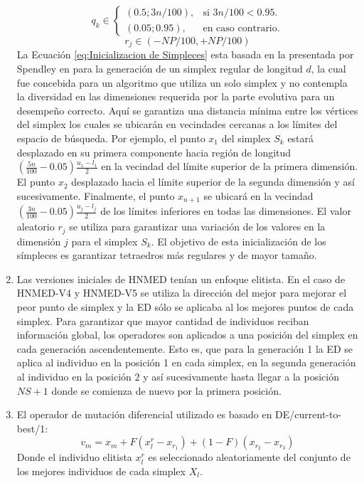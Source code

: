 \begin{enumerate}
	\begin{equation}
	q_k \in \begin{cases}
	(0.5;3n/100), & \text{si $3n/100 <0.95$}.\\
	(0.05;0.95), & \text{en caso contrario}.
	\end{cases}
	\end{equation}
	\begin{equation}
	r_j \in (-NP/100,+NP/100) 
	\end{equation}
	La Ecuación \ref{eq:Inicializacion de Simpleces} esta basada en la presentada por Spendley en \cite{spendley_sequential_1962} para la generación de un simplex regular de longitud $d$, la cual fue concebida para un algoritmo que utiliza un solo simplex y no contempla la diversidad en las dimensiones requerida por la parte evolutiva para un desempeño correcto. Aquí se garantiza una distancia mínima entre los vértices del simplex los cuales se ubicarán en vecindades cercanas a los límites del espacio de búsqueda. Por ejemplo, el punto $x_1$ del simplex $S_k$  estará desplazado en su primera componente hacia región de longitud $(\frac{5n}{100}-0.05)\frac{u_1-l_1}{2}$ en la vecindad del límite superior de la primera dimensión. El punto $x_2$ desplazado hacia el límite superior de la segunda dimensión y así sucesivamente. Finalmente, el punto $x_{n+1}$ se ubicará en la vecindad $(\frac{3n}{100}-0.05)\frac{u_j-l_j}{2}$ de los límites inferiores en todas las dimensiones. El valor aleatorio $r_j$ se utiliza para garantizar una variación de los valores en la dimensión $j$ para el simplex $S_k$. El objetivo de esta inicialización de los símpleces es garantizar tetraedros más regulares y de mayor tamaño. 
	
	\item Las versiones iniciales de HNMED tenían un enfoque elitista. En el caso de HNMED-V4 y HNMED-V5 se utiliza la dirección del mejor para mejorar el peor punto de simplex y la ED sólo se aplicaba al los mejores puntos de cada simplex. Para garantizar que mayor cantidad de individuos reciban información global, los operadores son aplicados a una posición del simplex en cada generación ascendentemente. Esto es, que para la generación 1 la ED se aplica al individuo en la posición 1 en cada simplex, en la segunda generación al individuo en la posición 2 y así sucesivamente hasta llegar a la posición $NS+1$ donde se comienza de nuevo por la primera posición.  
	\item El operador de mutación diferencial utilizado es basado en DE/current-to-best/1:
	\begin{equation}
	v_m= x_m+F(x^r_l-x_{r_1})+(1-F)(x_{r_2}-x_{r_3})
	\end{equation}
	Donde el individuo elitista $x^r_l$ es seleccionado aleatoriamente del conjunto de los mejores individuos de cada simplex $X_l$. 
\end{enumerate}


